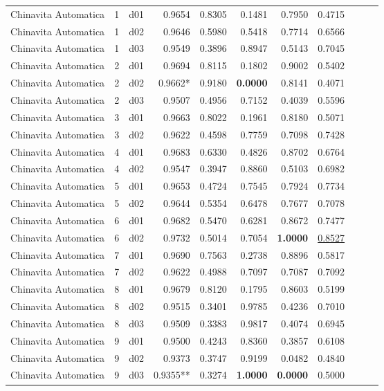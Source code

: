 \begin{landscape}
\begin{longtable}{rrrrrrrrrrr}
Chinavita Automatica  &          1 &     d01 &   0.9654 &  0.8305 &   0.1481 &   0.7950 &  0.4715 \\
Chinavita Automatica  &          1 &     d02 &   0.9646 &  0.5980 &   0.5418 &   0.7714 &  0.6566 \\
Chinavita Automatica  &          1 &     d03 &   0.9549 &  0.3896 &   0.8947 &   0.5143 &  0.7045 \\
Chinavita Automatica  &          2 &     d01 &   0.9694 &  0.8115 &   0.1802 &   0.9002 &  0.5402 \\
Chinavita Automatica  &          2 &     d02 &   0.9662* &  0.9180 &  \textbf{0.0000} &   0.8141 &  0.4071 \\
Chinavita Automatica  &          2 &     d03 &   0.9507 &  0.4956 &   0.7152 &   0.4039 &  0.5596 \\
Chinavita Automatica  &          3 &     d01 &   0.9663 &  0.8022 &   0.1961 &   0.8180 &  0.5071 \\
Chinavita Automatica  &          3 &     d02 &   0.9622 &  0.4598 &   0.7759 &   0.7098 &  0.7428 \\
Chinavita Automatica  &          4 &     d01 &   0.9683 &  0.6330 &   0.4826 &   0.8702 &  0.6764 \\
Chinavita Automatica  &          4 &     d02 &   0.9547 &  0.3947 &   0.8860 &   0.5103 &  0.6982 \\
Chinavita Automatica  &          5 &     d01 &   0.9653 &  0.4724 &   0.7545 &   0.7924 &  0.7734 \\
Chinavita Automatica  &          5 &     d02 &   0.9644 &  0.5354 &   0.6478 &   0.7677 &  0.7078 \\
Chinavita Automatica  &          6 &     d01 &   0.9682 &  0.5470 &   0.6281 &   0.8672 &  0.7477 \\
Chinavita Automatica  &          6 &     d02 &   0.9732 &  0.5014 &   0.7054 &   \textbf{1.0000} &  \underline{0.8527} \\
Chinavita Automatica  &          7 &     d01 &   0.9690 &  0.7563 &   0.2738 &   0.8896 &  0.5817 \\
Chinavita Automatica  &          7 &     d02 &   0.9622 &  0.4988 &   0.7097 &   0.7087 &  0.7092 \\
Chinavita Automatica  &          8 &     d01 &   0.9679 &  0.8120 &   0.1795 &   0.8603 &  0.5199 \\
Chinavita Automatica  &          8 &     d02 &   0.9515 &  0.3401 &   0.9785 &   0.4236 &  0.7010 \\
Chinavita Automatica  &          8 &     d03 &   0.9509 &  0.3383 &   0.9817 &   0.4074 &  0.6945 \\
Chinavita Automatica  &          9 &     d01 &   0.9500 &  0.4243 &   0.8360 &   0.3857 &  0.6108 \\
Chinavita Automatica  &          9 &     d02 &   0.9373 &  0.3747 &   0.9199 &   0.0482 &  0.4840 \\
Chinavita Automatica  &          9 &     d03 &   0.9355** &  0.3274 &   \textbf{1.0000} &   \textbf{0.0000} &  0.5000 \\


\end{longtable}
\end{landscape}
